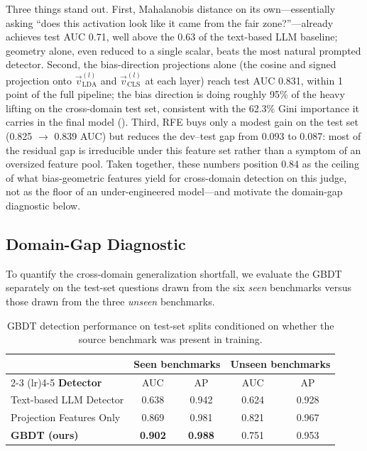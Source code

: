 \documentclass[11pt]{article}
\let\Cref\crtCref
\begin{document}
Three things stand out. First, Mahalanobis distance on its own---essentially asking ``does this activation look like it came from the fair zone?''---already achieves test AUC 0.71, well above the 0.63 of the text-based LLM baseline; geometry alone, even reduced to a single scalar, beats the most natural prompted detector. Second, the bias-direction projections alone (the cosine and signed projection onto $\vec{v}_{\text{LDA}}^{(l)}$ and $\vec{v}_{\text{CLS}}^{(l)}$ at each layer) reach test AUC 0.831, within 1 point of the full pipeline; the bias direction is doing roughly 95\% of the heavy lifting on the cross-domain test set, consistent with the 62.3\% Gini importance it carries in the final model (\Cref{tab:detection_feature_importance}). Third, RFE buys only a modest gain on the test set (0.825 $\to$ 0.839 AUC) but reduces the dev--test gap from 0.093 to 0.087: most of the residual gap is irreducible under this feature set rather than a symptom of an oversized feature pool. Taken together, these numbers position 0.84 as the ceiling of what bias-geometric features yield for cross-domain detection on this judge, not as the floor of an under-engineered model---and motivate the domain-gap diagnostic below.

\subsection{Domain-Gap Diagnostic}

To quantify the cross-domain generalization shortfall, we evaluate the GBDT separately on the test-set questions drawn from the six \emph{seen} benchmarks versus those drawn from the three \emph{unseen} benchmarks.

\begin{table}[h!]
\centering
\small
\setlength{\tabcolsep}{6pt}
\caption{GBDT detection performance on test-set splits conditioned on whether the source benchmark was present in training.}
\label{tab:detection_domain}
\begin{tabular}{l cc cc}
\toprule
& \multicolumn{2}{c}{\textbf{Seen benchmarks}} & \multicolumn{2}{c}{\textbf{Unseen benchmarks}} \\
\cmidrule(lr){2-3} \cmidrule(lr){4-5}
\textbf{Detector} & AUC & AP & AUC & AP \\
\midrule
Text-based LLM Detector & 0.638 & 0.942 & 0.624 & 0.928 \\
Projection Features Only & 0.869 & 0.981 & 0.821 & 0.967 \\
\textbf{GBDT (ours)} & \textbf{0.902} & \textbf{0.988} & 0.751 & 0.953 \\
\bottomrule
\end{tabular}
\end{table}
\end{document}
